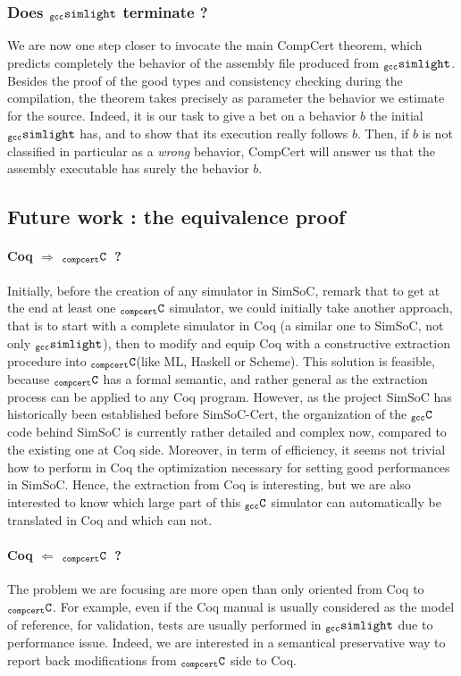 \documentclass[a4paper, 11pt]{article}
\newcommand{\gccSL}{$_{\tt gcc}{\tt simlight}$\xspace}
\newcommand{\C}{$_{\tt compcert}{\tt C}$\xspace}
\newcommand{\gccC}{$_{\tt gcc}{\tt C}$\xspace}
\newcommand{\simsoc}{SimSoC\xspace}
\newcommand{\SScert}{SimSoC-Cert\xspace}
\begin{document}

\subsubsection{Does \gccSL terminate ?}
We are now one step closer to invocate the main CompCert theorem, which predicts completely the behavior of the assembly file produced from \gccSL. Besides the proof of the good types and consistency checking during the compilation, the theorem takes precisely as parameter the behavior we estimate for the source. Indeed, it is our task to give a bet on a behavior $b$ the initial \gccSL has, and to show that its execution really follows $b$. Then, if $b$ is not classified in particular as a \emph{wrong} behavior, CompCert will answer us that the assembly executable has surely the behavior $b$.

\subsection{Future work : the equivalence proof}
\paragraph{Coq $\Longrightarrow$ \C~?}
Initially, before the creation of any simulator in \simsoc, remark that to get at the end at least one \C simulator, we could initially take another approach, that is to start with a complete simulator in Coq (a similar one to \simsoc, not only \gccSL), then to modify and equip Coq with a constructive extraction procedure into \C (like ML, Haskell or Scheme). This solution is feasible, because \C has a formal semantic, and rather general as the extraction process can be applied to any Coq program. However, as the project \simsoc has historically been established before \SScert, the organization of the \gccC code behind \simsoc is currently rather detailed and complex now, compared to the existing one at Coq side. Moreover, in term of efficiency, it seems not trivial how to perform in Coq the optimization necessary for setting good performances in SimSoC. Hence, the extraction from Coq is interesting, but we are also interested to know which large part of this \gccC simulator can automatically be translated in Coq and which can not.

\paragraph{Coq $\Longleftarrow$ \C~?}
The problem we are focusing are more open than only oriented from Coq to \C. For example, even if the Coq manual is usually considered as the model of reference, for validation, tests are usually performed in \gccSL due to performance issue. Indeed, we are interested in a semantical preservative way to report back modifications from \C side to Coq. 
\end{document}
